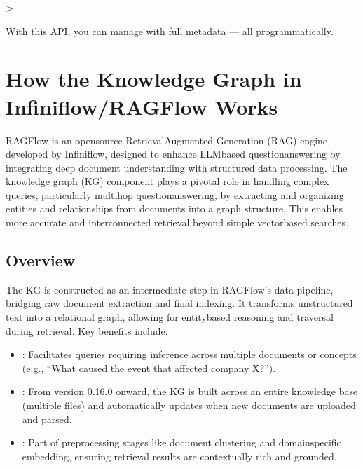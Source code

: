 \documentclass[letterpaper,10pt,english]{sphinxmanual}
\begin{document}
\sphinxAtStartPar
\textgreater{} 

\sphinxAtStartPar
With this API, you can manage  with full metadata — all programmatically.

\sphinxstepscope


\chapter{How the Knowledge Graph in Infiniflow/RAGFlow Works}
\label{\detokenize{graph:how-the-knowledge-graph-in-infiniflow-ragflow-works}}\label{\detokenize{graph::doc}}
\sphinxAtStartPar
RAGFlow is an open\sphinxhyphen{}source Retrieval\sphinxhyphen{}Augmented Generation (RAG) engine developed by Infiniflow, designed to enhance LLM\sphinxhyphen{}based question\sphinxhyphen{}answering by integrating deep document understanding with structured data processing. The knowledge graph (KG) component plays a pivotal role in handling complex queries, particularly multi\sphinxhyphen{}hop question\sphinxhyphen{}answering, by extracting and organizing entities and relationships from documents into a graph structure. This enables more accurate and interconnected retrieval beyond simple vector\sphinxhyphen{}based searches.


\section{Overview}
\label{\detokenize{graph:overview}}
\sphinxAtStartPar
The KG is constructed as an intermediate step in RAGFlow’s data pipeline, bridging raw document extraction and final indexing. It transforms unstructured text into a relational graph, allowing for entity\sphinxhyphen{}based reasoning and traversal during retrieval. Key benefits include:
\begin{itemize}
\item {} 
\sphinxAtStartPar
{}: Facilitates queries requiring inference across multiple documents or concepts (e.g., “What caused the event that affected company X?”).

\item {} 
\sphinxAtStartPar
{}: From version 0.16.0 onward, the KG is built across an entire knowledge base (multiple files) and automatically updates when new documents are uploaded and parsed.

\item {} 
\sphinxAtStartPar
{}: Part of preprocessing stages like document clustering and domain\sphinxhyphen{}specific embedding, ensuring retrieval results are contextually rich and grounded.

\end{itemize}
\end{document}
